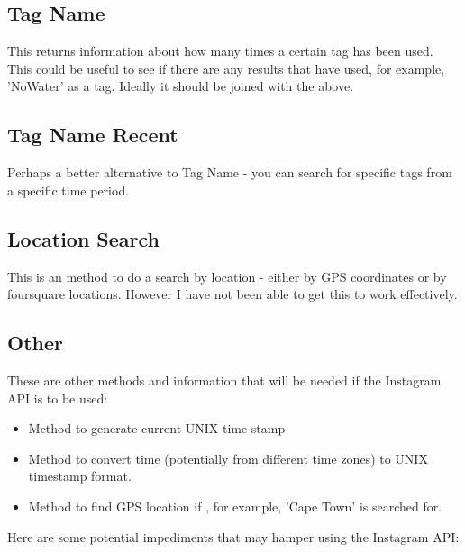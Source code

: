 \documentclass{article}
\begin{document}
\subsection{Tag Name}
This returns information about how many times a certain tag has been used. This could be useful to see if there are any results that have used, for example, 'NoWater' as a tag. Ideally it should be joined with the above.
\subsection{Tag Name Recent}
Perhaps a better alternative to Tag Name - you can search for specific tags from a specific time period.
\subsection{Location Search}
This is an method to do a search by location - either by GPS coordinates or by foursquare locations. However I have not been able to get this to work effectively.
\subsection{Other}
These are other methods and information that will be needed if the Instagram API is to be used:
\begin{itemize}
\item{Method to generate current UNIX time-stamp}
\item{Method to convert time (potentially from different time zones) to UNIX timestamp format.}
\item{Method to find GPS location if , for example, 'Cape Town' is searched for.}
\end{itemize}
Here are some potential impediments that may hamper using the Instagram API:
\end{document}
